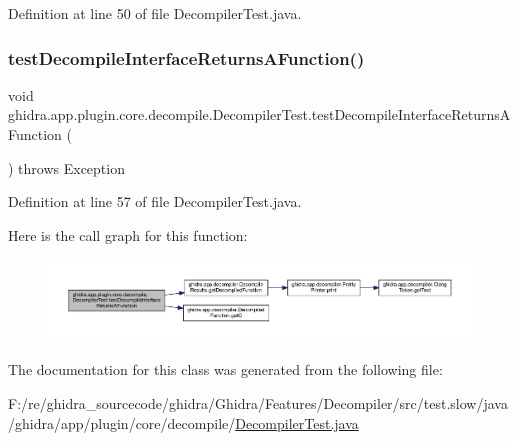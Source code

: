 Definition at line 50 of file Decompiler\+Test.\+java.

\mbox{\label{classghidra_1_1app_1_1plugin_1_1core_1_1decompile_1_1_decompiler_test_a92c99e52e7f581f731f5d23aded7c15b}} 
\subsubsection{\texorpdfstring{testDecompileInterfaceReturnsAFunction()}{testDecompileInterfaceReturnsAFunction()}}
{\footnotesize\ttfamily void ghidra.\+app.\+plugin.\+core.\+decompile.\+Decompiler\+Test.\+test\+Decompile\+Interface\+Returns\+A\+Function (\begin{DoxyParamCaption}{ }\end{DoxyParamCaption}) throws Exception\hspace{0.3cm}{\ttfamily [inline]}}



Definition at line 57 of file Decompiler\+Test.\+java.

Here is the call graph for this function\+:
\nopagebreak
\begin{figure}[H]
\begin{center}
\leavevmode
\includegraphics[width=350pt]{classghidra_1_1app_1_1plugin_1_1core_1_1decompile_1_1_decompiler_test_a92c99e52e7f581f731f5d23aded7c15b_cgraph}
\end{center}
\end{figure}


The documentation for this class was generated from the following file\+:\begin{DoxyCompactItemize}
\item 
F\+:/re/ghidra\+\_\+sourcecode/ghidra/\+Ghidra/\+Features/\+Decompiler/src/test.\+slow/java/ghidra/app/plugin/core/decompile/\mbox{\hyperlink{_decompiler_test_8java}{Decompiler\+Test.\+java}}\end{DoxyCompactItemize}
